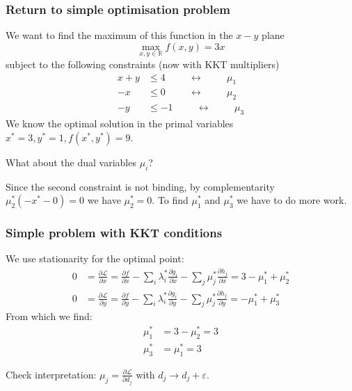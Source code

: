 \documentclass[10pt,aspectratio=169,dvipsnames]{beamer}
\def\l{\lambda}
\def\m{\mu}
\def\d{\partial}
\def\cL{\mathcal{L}}
\begin{document}
\begin{frame}
  \frametitle{Return to simple optimisation problem}

  We want to find the maximum of this function in the $x-y$ plane
  \begin{equation*}
    \max_{x,y\in \mathbb{R}} f(x,y) = 3x
  \end{equation*}
  subject to the following constraints (now with KKT multipliers)
  \begin{align*}
    x + y & \leq 4  \hspace{1cm}\leftrightarrow\hspace{1cm} \m_1 \\
    -x & \leq 0  \hspace{1cm}\leftrightarrow\hspace{1cm} \m_2\\
    -y & \leq -1  \hspace{1cm}\leftrightarrow\hspace{1cm} \m_3
  \end{align*}
  We know the optimal solution in the \alert{primal variables} $x^* = 3, y^* = 1, f(x^*,y^*) = 9$.

  What about the \alert{dual variables} $\m_i$?

  Since the second constraint is not binding, by complementarity
  $\m_2^*(-x^* - 0) = 0$ we have $\m_2^* = 0$. To find $\m_1^*$ and
  $\m_3^*$ we have to do more work.


\end{frame}


\begin{frame}
  \frametitle{Simple problem with KKT conditions}

  We use stationarity for the optimal point:
  \begin{align*}
    0 & = \frac{\d \cL}{\d x } =   \frac{\d f}{\d x} - \sum_i \l_i^* \frac{\d g_i}{\d x}  - \sum_j \m_j^* \frac{\d h_j}{\d x} = 3 - \m_1^* + \m_2^* \\
    0 & = \frac{\d \cL}{\d y } =   \frac{\d f}{\d y} - \sum_i \l_i^* \frac{\d g_i}{\d y}  - \sum_j \m_j^* \frac{\d h_j}{\d y} = - \m_1^* + \m_3^*
  \end{align*}
  From which we find:
  \begin{align*}
    \m_1^* & = 3 - \m_2^* = 3 \\
    \m_3^* & = \m_1^* = 3
  \end{align*}

  Check interpretation: $\m_j = \frac{\d \cL}{\d d_j}$ with $d_j \to d_j + \varepsilon$.
\end{frame}
\end{document}

